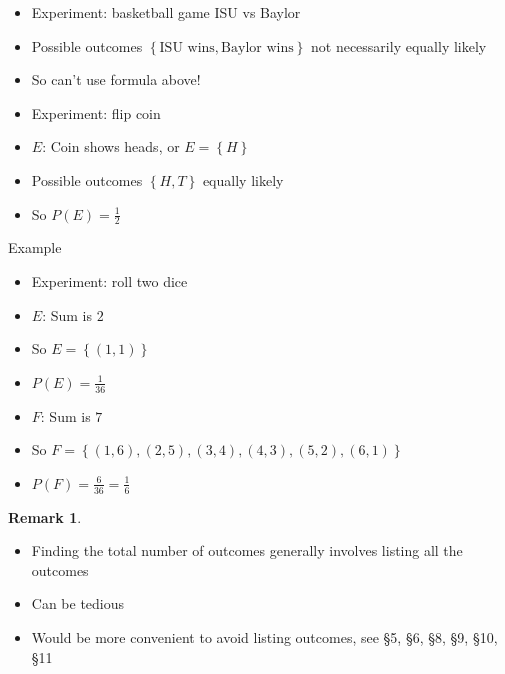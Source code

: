 \documentclass[handout]{beamer}
\theoremstyle{definition}
\newtheorem{remark}{Remark}
\begin{document}
\begin{frame}
\begin{example}
\begin{itemize}
\item Experiment: basketball game ISU vs Baylor
\item Possible outcomes $\left\{\text{ISU wins},
\text{Baylor wins}\right\}$ \alert{not necessarily}
equally likely
\item So \alert{can't} use formula above!
\end{itemize}
\end{example}
\begin{example}
\begin{itemize}
\item Experiment: flip coin
\item $E$: Coin shows heads, or $E=\left\{H\right\}$
\item Possible outcomes $\left\{H,T\right\}$ equally likely
\item So $P\left(E\right)=\frac{1}{2}$
\end{itemize}
\end{example}
\end{frame}

\begin{frame}{Example}
\begin{itemize}
\item Experiment: roll two dice
\item $E$: Sum is $2$
\item So $E=\left\{\left(1,1\right)\right\}$
\item $P\left(E\right)=\frac{1}{36}$
\item $F$: Sum is $7$
\item So $F=\left\{\left(1,6\right),
\left(2,5\right),\left(3,4\right),
\left(4,3\right),\left(5,2\right),\left(6,1\right)\right\}$
\item $P\left(F\right)=\frac{6}{36}=\frac{1}{6}$
\end{itemize}
\begin{remark}
\begin{itemize}
\item Finding the total number of outcomes
generally involves \alert{listing} all the outcomes
\item Can be tedious
\item Would be more convenient to avoid listing outcomes, see \S5, \S6, \S8,
\S9, \S10, \S11
\end{itemize}
\end{remark}
\end{frame}
\end{document}
